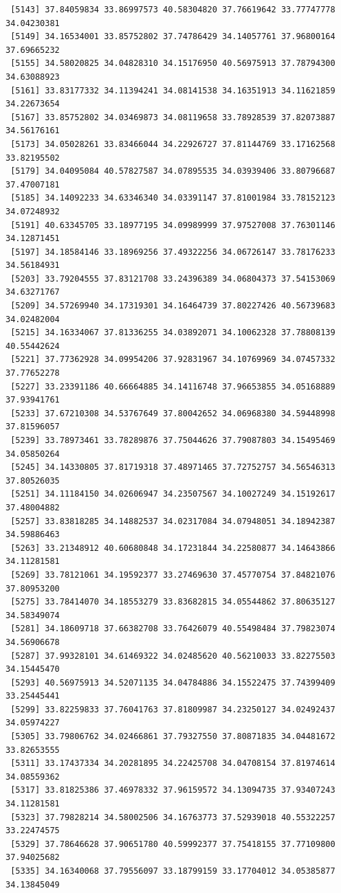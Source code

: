 \documentclass[
  letterpaper,
  DIV=11,
  numbers=noendperiod]{scrartcl}
\begin{document}
\begin{verbatim}
 [5143] 37.84059834 33.86997573 40.58304820 37.76619642 33.77747778 34.04230381
 [5149] 34.16534001 33.85752802 37.74786429 34.14057761 37.96800164 37.69665232
 [5155] 34.58020825 34.04828310 34.15176950 40.56975913 37.78794300 34.63088923
 [5161] 33.83177332 34.11394241 34.08141538 34.16351913 34.11621859 34.22673654
 [5167] 33.85752802 34.03469873 34.08119658 33.78928539 37.82073887 34.56176161
 [5173] 34.05028261 33.83466044 34.22926727 37.81144769 33.17162568 33.82195502
 [5179] 34.04095084 40.57827587 34.07895535 34.03939406 33.80796687 37.47007181
 [5185] 34.14092233 34.63346340 34.03391147 37.81001984 33.78152123 34.07248932
 [5191] 40.63345705 33.18977195 34.09989999 37.97527008 37.76301146 34.12871451
 [5197] 34.18584146 33.18969256 37.49322256 34.06726147 33.78176233 34.56184931
 [5203] 33.79204555 37.83121708 33.24396389 34.06804373 37.54153069 34.63271767
 [5209] 34.57269940 34.17319301 34.16464739 37.80227426 40.56739683 34.02482004
 [5215] 34.16334067 37.81336255 34.03892071 34.10062328 37.78808139 40.55442624
 [5221] 37.77362928 34.09954206 37.92831967 34.10769969 34.07457332 37.77652278
 [5227] 33.23391186 40.66664885 34.14116748 37.96653855 34.05168889 37.93941761
 [5233] 37.67210308 34.53767649 37.80042652 34.06968380 34.59448998 37.81596057
 [5239] 33.78973461 33.78289876 37.75044626 37.79087803 34.15495469 34.05850264
 [5245] 34.14330805 37.81719318 37.48971465 37.72752757 34.56546313 37.80526035
 [5251] 34.11184150 34.02606947 34.23507567 34.10027249 34.15192617 37.48004882
 [5257] 33.83818285 34.14882537 34.02317084 34.07948051 34.18942387 34.59886463
 [5263] 33.21348912 40.60680848 34.17231844 34.22580877 34.14643866 34.11281581
 [5269] 33.78121061 34.19592377 33.27469630 37.45770754 37.84821076 37.80953200
 [5275] 33.78414070 34.18553279 33.83682815 34.05544862 37.80635127 34.58349074
 [5281] 34.18609718 37.66382708 33.76426079 40.55498484 37.79823074 34.56906678
 [5287] 37.99328101 34.61469322 34.02485620 40.56210033 33.82275503 34.15445470
 [5293] 40.56975913 34.52071135 34.04784886 34.15522475 37.74399409 33.25445441
 [5299] 33.82259833 37.76041763 37.81809987 34.23250127 34.02492437 34.05974227
 [5305] 33.79806762 34.02466861 37.79327550 37.80871835 34.04481672 33.82653555
 [5311] 33.17437334 34.20281895 34.22425708 34.04708154 37.81974614 34.08559362
 [5317] 33.81825386 37.46978332 37.96159572 34.13094735 37.93407243 34.11281581
 [5323] 37.79828214 34.58002506 34.16763773 37.52939018 40.55322257 33.22474575
 [5329] 37.78646628 37.90651780 40.59992377 37.75418155 37.77109800 37.94025682
 [5335] 34.16340068 37.79556097 33.18799159 33.17704012 34.05385877 34.13845049

\end{verbatim}
\end{document}
